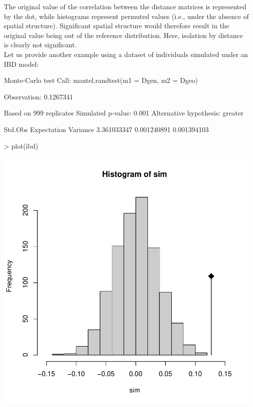 \documentclass{article}
\begin{document}
\noindent The original value of the correlation between the distance matrices is represented by the
dot, while histograms represent permuted values (i.e., under the absence of spatial structure).
Significant spatial structure would therefore result in the original value being out of the
reference distribution.
Here, isolation by distance is clearly not significant.
\\


Let us provide another example using a dataset of individuals simulated under an IBD model:
\begin{Schunk}
\begin{Soutput}
Monte-Carlo test
Call: mantel.randtest(m1 = Dgen, m2 = Dgeo)

Observation: 0.1267341 

Based on 999 replicates
Simulated p-value: 0.001 
Alternative hypothesis: greater 

    Std.Obs Expectation    Variance 
3.361033347 0.001240891 0.001394103 
\end{Soutput}
\end{Schunk}
\begin{Schunk}
\begin{Sinput}
> plot(ibd)
\end{Sinput}
\end{Schunk}
\includegraphics{figs/base-082}
\end{document}
